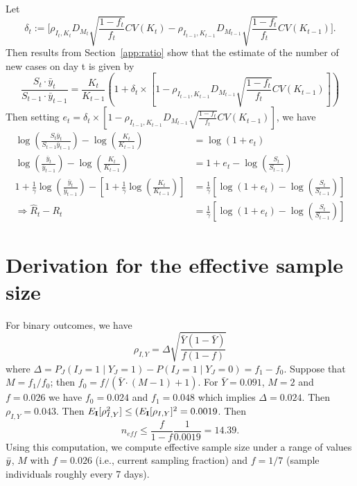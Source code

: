 \documentclass[aoas]{amsart}
\def\I{\bf I}
\begin{document}
Let
$$
\delta_t := \bigg[ \rho_{I_t,K_t} D_{M_t} \sqrt{\frac{1-f_t}{f_t}} CV (K_t)  -\rho_{I_{t-1},K_{t-1}} D_{M_{t-1}} \sqrt{\frac{1-f_t}{f_t}} CV (K_{t-1}) \bigg].
$$
Then results from Section~\ref{app:ratio} show that the estimate of the number of new cases on day t is given by
$$
\frac{S_t \cdot \bar y_t}{S_{t-1} \cdot \bar y_{t-1}} =
\frac{K_t}{K_{t-1}} \left( 1 + \delta_t \times \left[ 1 - \rho_{I_{t-1},K_{t-1}} D_{M_{t-1}} \sqrt{\frac{1-f_t}{f_t}} CV (K_{t-1}) \right] \right)
$$
Then setting $e_t = \delta_t \times [1 - \rho_{I_{t-1},K_{t-1}} D_{M_{t-1}} \sqrt{\frac{1-f_t}{f_t}} CV (K_{t-1}) ]$, we have
$$
\begin{aligned}
\log \left( \frac{S_t \bar y_t}{S_{t-1} \bar y_{t-1}} \right) - \log \left( \frac{K_t}{K_{t-1}} \right) &= \log (1 + e_t) \\
\log \left( \frac{\bar y_t}{\bar y_{t-1}} \right) - \log \left( \frac{K_t}{K_{t-1}} \right) &= 1 + e_t - \log \left( \frac{S_t}{S_{t-1}} \right) \\
1 + \frac{1}{\gamma} \log \left( \frac{\bar y_t}{\bar y_{t-1}} \right) - \left[ 1 + \frac{1}{\gamma} \log \left( \frac{K_t}{K_{t-1}} \right) \right] &= \frac{1}{\gamma} \left[ \log \left( 1 + e_t \right) - \log \left( \frac{S_{t}}{S_{t-1}} \right) \right] \\
\Rightarrow \hat R_t - R_t &= \frac{1}{\gamma} \left[ \log \left( 1 + e_t \right) - \log \left( \frac{S_{t}}{S_{t-1}} \right) \right]
\end{aligned}
$$



\section{Derivation for the effective sample size}
\label{section:effss}

For binary outcomes, we have
\begin{equation} \label{eq:binaryrho}
\rho_{I,Y} = \Delta \sqrt{\frac{\bar Y (1 - \bar Y)}{f (1-f)} }
\end{equation}
where $\Delta = P_J (I_J = 1 \mid Y_J = 1) - P(I_J = 1 \mid Y_J = 0) = f_1 - f_0$.  Suppose that $M = f_1/f_0$; then
$f_0 = f / (\bar Y \cdot (M-1) + 1)$.  For $\bar Y = 0.091$, $M = 2$ and $f = 0.026$ we have $f_0 = 0.024$ and $f_1 = 0.048$ which implies $\Delta = 0.024$.
Then $\rho_{I,Y} = 0.043$.  Then $E_{\I} [ \rho_{I,Y}^2 ] \leq (E_{\I} [\rho_{I,Y} ]^2 = 0.0019$.  Then
$$
n_{eff} \leq \frac{f}{1-f} \frac{1}{0.0019} = 14.39.
$$
Using this computation, we compute effective sample size under a range of values $\bar{y}$, $M$ with $f = 0.026$ (i.e., current sampling fraction) and $f =1/7$ (sample individuals roughly every 7 days).
\end{document}
